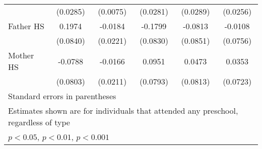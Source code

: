 \begin{table}[htbp]
\begin{tabular}{l*{5}{c}}
            &    (0.0285)         &    (0.0075)         &    (0.0281)         &    (0.0289)         &    (0.0256)         \\
\addlinespace
Father HS   &      0.1974\sym{*}  &     -0.0184         &     -0.1799\sym{*}  &     -0.0813         &     -0.0108         \\
            &    (0.0840)         &    (0.0221)         &    (0.0830)         &    (0.0851)         &    (0.0756)         \\
\addlinespace
Mother HS   &     -0.0788         &     -0.0166         &      0.0951         &      0.0473         &      0.0353         \\
            &    (0.0803)         &    (0.0211)         &    (0.0793)         &    (0.0813)         &    (0.0723)         \\
\bottomrule
\multicolumn{6}{l}{\footnotesize Standard errors in parentheses}\\
\multicolumn{6}{l}{\footnotesize Estimates shown are for individuals that attended any preschool, regardless of type}\\
\multicolumn{6}{l}{\footnotesize \sym{*} \(p<0.05\), \sym{**} \(p<0.01\), \sym{***} \(p<0.001\)}\\
\end{tabular}
\end{table}
